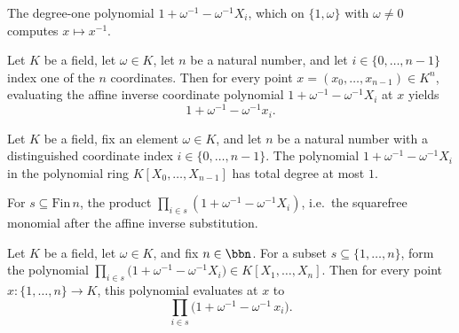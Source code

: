 \begin{definition}
\label{RazborovSmolensky.affineInvPoly}
\leanok
The degree-one polynomial $1 + \omega^{-1} - \omega^{-1} X_i$, which on $\{1,\omega\}$
with $\omega \neq 0$ computes $x \mapsto x^{-1}$.
\end{definition}

\begin{theorem}
\label{RazborovSmolensky.affineInvPoly_eval}
\leanok
{}
Let $K$ be a field, let $\omega \in K$, let $n$ be a natural number, and let $i \in
\{0,\dots,n-1\}$ index one of the $n$ coordinates. Then for every point $x =
(x_0,\dots,x_{n-1}) \in K^n$, evaluating the affine inverse coordinate polynomial $1 +
\omega^{-1} - \omega^{-1} X_i$ at $x$ yields \[ 1 + \omega^{-1} - \omega^{-1} x_i. \]
\end{theorem}

\begin{theorem}
\label{RazborovSmolensky.affineInvPoly_totalDegree_le_one}
\leanok
{}
Let $K$ be a field, fix an element $\omega \in K$, and let $n$ be a natural number with
a distinguished coordinate index $i \in \{0,\dots,n-1\}$. The polynomial $1 +
\omega^{-1} - \omega^{-1} X_i$ in the polynomial ring $K[X_0,\dots,X_{n-1}]$ has total
degree at most $1$.
\end{theorem}

\begin{definition}
\label{RazborovSmolensky.affineSquarefreeMonomial}
\leanok
{}
For $s \subseteq \mathrm{Fin}\,n$, the product $\prod_{i \in s}(1 + \omega^{-1} -
\omega^{-1}X_i)$, i.e.\ the squarefree monomial after the affine inverse substitution.
\end{definition}

\begin{theorem}
\label{RazborovSmolensky.affineSquarefreeMonomial_eval}
\leanok
{}
Let $K$ be a field, let $\omega \in K$, and fix $n \in \bbn$. For a subset $s \subseteq
\{1,\dots,n\}$, form the polynomial $\prod_{i \in s}\bigl(1 + \omega^{-1} - \omega^{-1}
X_i\bigr) \in K[X_1,\dots,X_n]$. Then for every point $x \colon \{1,\dots,n\} \to K$,
this polynomial evaluates at $x$ to
\[
\prod_{i \in s}\bigl(1 + \omega^{-1} - \omega^{-1}\, x_i\bigr).
\]
\end{theorem}


